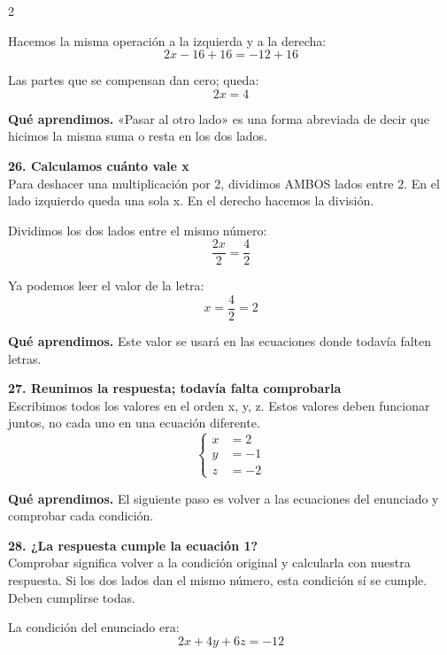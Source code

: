 \documentclass[11pt,a4paper,landscape]{article}
\begin{document}
\begin{multicols*}{2}
\begin{minipage}{\linewidth}
\par\smallskip Hacemos la misma operación a la izquierda y a la derecha:
\[2x - 16 + 16=-12 + 16\]
\par\smallskip Las partes que se compensan dan cero; queda:
\[2x=4\]
\par\smallskip\textbf{Qué aprendimos.} «Pasar al otro lado» es una forma abreviada de decir que hicimos la misma suma o resta en los dos lados.
\end{minipage}\par\medskip
\noindent\begin{minipage}{\linewidth}\textbf{26. Calculamos cuánto vale x}\\[2pt]Para deshacer una multiplicación por 2, dividimos AMBOS lados entre 2. En el lado izquierdo queda una sola x. En el derecho hacemos la división.
\par\smallskip Dividimos los dos lados entre el mismo número:
\[\frac{2x}{2}=\frac{4}{2}\]
\par\smallskip Ya podemos leer el valor de la letra:
\[x=\frac{4}{2}=2\]
\par\smallskip\textbf{Qué aprendimos.} Este valor se usará en las ecuaciones donde todavía falten letras.
\end{minipage}\par\medskip
\noindent\begin{minipage}{\linewidth}\textbf{27. Reunimos la respuesta; todavía falta comprobarla}\\[2pt]Escribimos todos los valores en el orden x, y, z. Estos valores deben funcionar juntos, no cada uno en una ecuación diferente.
\[\left\{\begin{aligned}x&=2\\y&=-1\\z&=-2\end{aligned}\right.\]
\par\smallskip\textbf{Qué aprendimos.} El siguiente paso es volver a las ecuaciones del enunciado y comprobar cada condición.
\end{minipage}\par\medskip
\noindent\begin{minipage}{\linewidth}\textbf{28. ¿La respuesta cumple la ecuación 1?}\\[2pt]Comprobar significa volver a la condición original y calcularla con nuestra respuesta. Si los dos lados dan el mismo número, esta condición sí se cumple. Deben cumplirse todas.
\par\smallskip La condición del enunciado era:
\[2x + 4y + 6z = -12\]

\end{minipage}
\end{multicols*}
\end{document}
